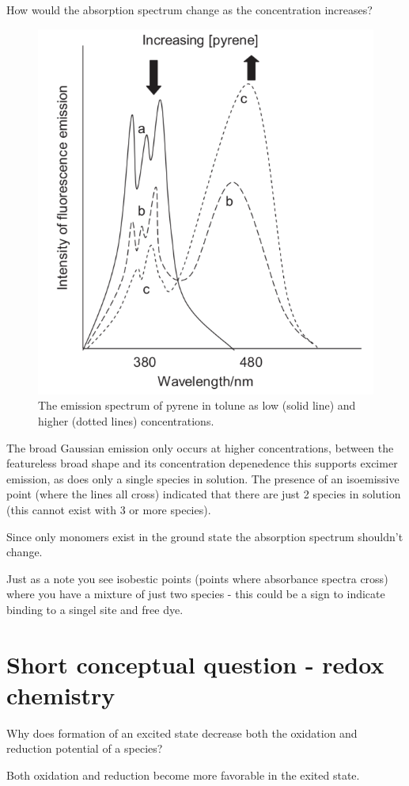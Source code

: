 \documentclass[
]{book}
\begin{document}
How would the absorption spectrum change as the concentration increases?

\begin{figure}

{\centering \includegraphics[width=0.3\linewidth]{images/pyrene} 

}

\caption{The emission spectrum of pyrene in tolune as low (solid line) and higher (dotted lines) concentrations.}\label{fig:pyrene}
\end{figure}

The broad Gaussian emission only occurs at higher concentrations, between the featureless broad shape and its concentration depenedence this supports excimer emission, as does only a single species in solution. The presence of an isoemissive point (where the lines all cross) indicated that there are just 2 species in solution (this cannot exist with 3 or more species).

Since only monomers exist in the ground state the absorption spectrum shouldn't change.

Just as a note you see isobestic points (points where absorbance spectra cross) where you have a mixture of just two species - this could be a sign to indicate binding to a singel site and free dye.

\hypertarget{short-conceptual-question---redox-chemistry}{%
\section{Short conceptual question - redox chemistry}\label{short-conceptual-question---redox-chemistry}}

Why does formation of an excited state decrease both the oxidation and reduction potential of a species?

Both oxidation and reduction become more favorable in the exited state.
\end{document}

